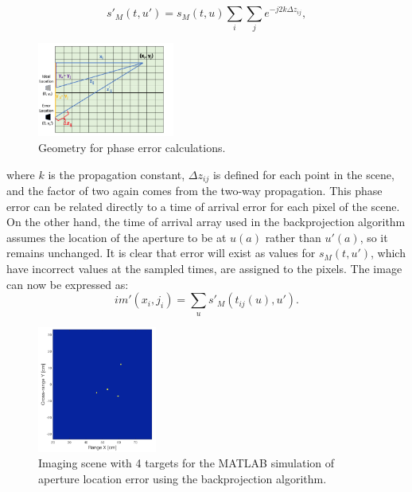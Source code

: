 \documentclass{article}
\begin{document}
\begin{equation}
\label{newSig}
s'_M(t,u') = s_M(t,u)\sum_{i}\sum_{j}e^{-j2k\Delta{z}_{ij}},
\end{equation}
\begin{figure}[h!]
    \centering
    \includegraphics[width=0.4\textwidth]{Figures/PhaseErrMap.png}
\caption{Geometry for phase error calculations.}
\label{PhaseMap}
\end{figure}
\newline
where $k$ is the propagation constant, $\Delta{z}_{ij}$ is defined for each point in the scene, and the factor of two again comes from the two-way propagation. This phase error can be related directly to a time of arrival error for each pixel of the scene. On the other hand, the time of arrival array used in the backprojection algorithm assumes the location of the aperture to be at $u(a)$ rather than $u'(a)$, so it remains unchanged. It is clear that error will exist as values for $s_M(t,u')$, which have incorrect values at the sampled times, are assigned to the pixels. The image can now be expressed as:
\begin{equation}
\label{newIM}
im'(x_i,j_i) = \sum_{u}s'_M(t_{ij}(u),u').
\end{equation}
\begin{figure}[h!]
    \centering
    \includegraphics[width=0.35\textwidth]{Figures/TrueTar.png}
\caption{Imaging scene with 4 targets for the MATLAB simulation of aperture location error using the backprojection algorithm.}
\label{TrueTar}
\end{figure}
\indent
\end{document}
